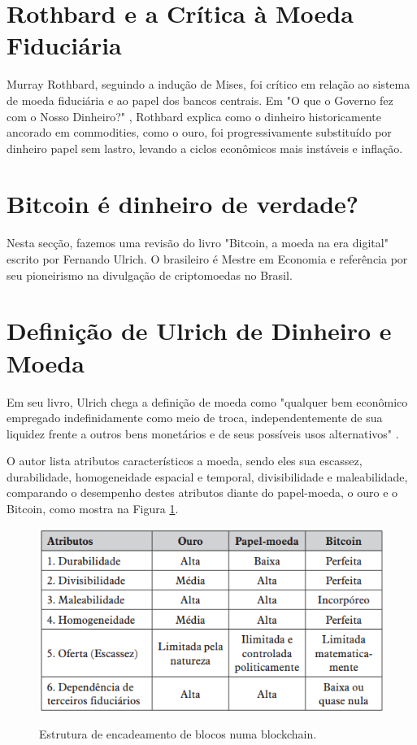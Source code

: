\section*{Rothbard e a Crítica à Moeda Fiduciária}
Murray Rothbard, seguindo a indução de Mises, foi crítico em relação ao sistema de moeda fiduciária e ao papel dos bancos centrais. Em "O que o Governo fez com o Nosso Dinheiro?" \cite{rothbard2022governo}, Rothbard explica como o dinheiro historicamente ancorado em commodities, como o ouro, foi progressivamente substituído por dinheiro papel sem lastro, levando a ciclos econômicos mais instáveis e inflação.

\section{Bitcoin é dinheiro de verdade?} \label{sec:dinheiro}
Nesta secção, fazemos uma revisão do livro "Bitcoin, a moeda na era digital"\cite{Ulrich2014} escrito por Fernando Ulrich. O brasileiro é Mestre em Economia e referência por seu pioneirismo na divulgação de criptomoedas no Brasil. 

\section*{Definição de Ulrich de Dinheiro e Moeda}
Em seu livro, Ulrich chega a definição de moeda como "qualquer bem econômico empregado indefinidamente como meio de troca, independentemente de sua liquidez frente a outros bens monetários e de seus possíveis usos alternativos" \cite[P.89]{Ulrich2014}.

O autor lista atributos característicos a moeda, sendo eles sua escassez,
durabilidade, homogeneidade espacial e temporal, divisibilidade e maleabilidade, comparando o desempenho destes atributos diante do papel-moeda, o ouro e o Bitcoin, como mostra na Figura \ref*{fig:atributos}.

\begin{figure} [h]
    \centering
        \caption{Estrutura de encadeamento de blocos numa blockchain.}
        \includegraphics[width=.8\linewidth]{images/atributos.png}
        \label{fig:atributos}
\end{figure}

